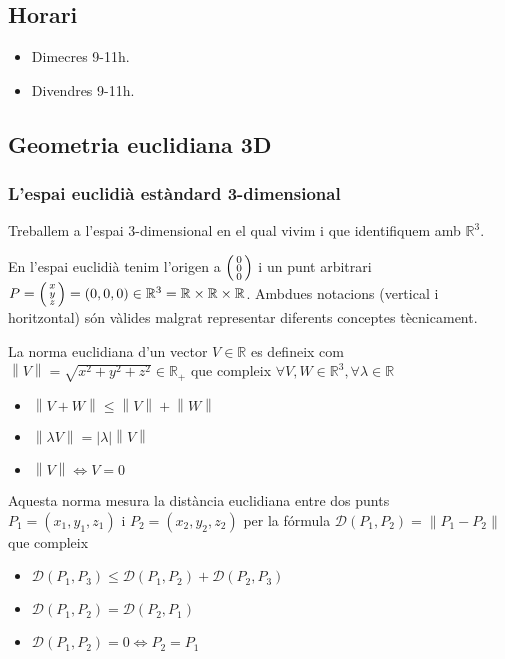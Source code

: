 \documentclass[../main.tex]{subfiles}
\begin{document}
\subsection*{Horari}
\begin{itemize}
    \item Dimecres 9-11h.
    \item Divendres 9-11h.
\end{itemize}
\subsection{Geometria euclidiana 3D}
\subsubsection{L'espai euclidià estàndard 3-dimensional}
Treballem a l'espai 3-dimensional en el qual vivim i que identifiquem amb $\mathbb{R}^3$.
\begin{notacio}
    En l'espai euclidià tenim l'origen a $\begin{psmallmatrix}0\\0\\0\end{psmallmatrix}$ i un punt
    arbitrari $P = \begin{psmallmatrix}x\\y\\z\end{psmallmatrix} = \left(0,0,0\right) \in \mathbb{R}^3 = \mathbb{R} \times \mathbb{R} \times \mathbb{R}$.
    Ambdues notacions (vertical i horitzontal) són vàlides malgrat representar diferents conceptes
    tècnicament.
\end{notacio}
\begin{definicio}
    La norma euclidiana d'un vector $V \in \mathbb{R}$ es defineix com $\left\lVert V\right\rVert = \sqrt{x^2+y^2+z^2} \in \mathbb{R}_+$
    que compleix $\forall V, W \in \mathbb{R}^3, \forall \lambda \in \mathbb{R}$
    \begin{itemize}
        \item $\left\lVert V+W\right\rVert \leq \left\lVert V\right\rVert + \left\lVert W\right\rVert$
        \item $\left\lVert \lambda V\right\rVert = \left\lvert \lambda\right\rvert\left\lVert V\right\rVert$
        \item $\left\lVert V\right\rVert\iff V = 0$
    \end{itemize}
    Aquesta norma mesura la distància euclidiana entre dos punts $P_1 = (x_1, y_1, z_1)\text{ i }P_2 = (x_2, y_2, z_2)$
    per la fórmula
    $\mathcal{D}\left(P_1, P_2\right) = \left\lVert P_1 - P_2\right\rVert$ que compleix
    \begin{itemize}
        \item $\mathcal{D}\left(P_1, P_3\right) \leq \mathcal{D}\left(P_1, P_2\right) + \mathcal{D}\left(P_2, P_3\right)$
        \item $\mathcal{D}\left(P_1, P_2\right) = \mathcal{D}\left(P_2, P_1\right)$
        \item $\mathcal{D}\left(P_1, P_2\right) = 0 \iff P_2 = P_1$
    \end{itemize}
\end{definicio}
\end{document}
